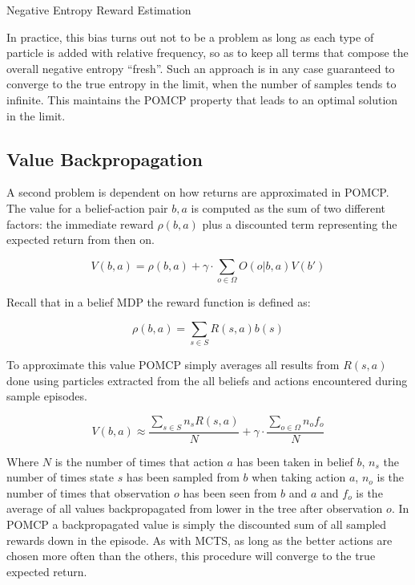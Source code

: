 \begin{algorithm}[H]
    \caption{Negative Entropy Reward Estimation}


\end{algorithm}

In practice, this bias turns out not to be a problem as long as each type of particle is added with
relative frequency, so as to keep all terms that compose the overall negative entropy ``fresh''.
Such an approach is in any case guaranteed to converge to the true entropy in the limit, when the
number of samples tends to infinite. This maintains the POMCP property that leads to an optimal
solution in the limit.

\subsection{Value Backpropagation}

A second problem is dependent on how returns are approximated in POMCP. The value for a
belief-action pair $b,a$ is computed as the sum of two different factors: the immediate reward
$\rho(b,a)$ plus a discounted term representing the expected return from then on.

\[ V(b,a) = \rho(b,a) + \gamma \cdot \sum_{o\in \Omega} O(o|b,a) V(b') \]

Recall that in a belief MDP the reward function is defined as:

\[ \rho(b,a) = \sum_{s\in S} R(s,a) b(s) \]

To approximate this value POMCP simply averages all results from $R(s,a)$ done using particles
extracted from the all beliefs and actions encountered during sample episodes.

\[ V(b,a) \approx \frac{\sum_{s \in S} n_s R(s,a)}{N} + \gamma \cdot \frac{\sum_{o\in \Omega} n_o f_o}{N} \]

Where $N$ is the number of times that action $a$ has been taken in belief $b$, $n_s$ the number of
times state $s$ has been sampled from $b$ when taking action $a$, $n_o$ is the number of times that
observation $o$ has been seen from $b$ and $a$ and $f_o$ is the average of all values backpropagated
from lower in the tree after observation $o$. In POMCP a backpropagated value is simply the
discounted sum of all sampled rewards down in the episode. As with MCTS, as long as the better
actions are chosen more often than the others, this procedure will converge to the true expected
return.

